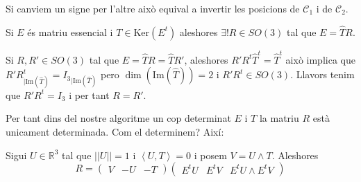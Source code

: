 \documentclass[../main.tex]{subfiles}
\begin{document}
\begin{enumerate}
		\begin{obs}
			Si canviem un signe per l'altre això equival a invertir les posicions de $\mathcal{C}_1$ i de $\mathcal{C}_2$.
		\end{obs}
		\begin{proposicio}
			Si $E$ és matriu essencial i $T \in \text{Ker}(E^t)$ aleshores $\exists!R\in SO(3)$ tal que $E = \hat{T}R$.
		\end{proposicio}
		\begin{demostracio}
			Si $R, R' \in SO(3)$ tal que $E = \hat{T}R = \hat{T}R'$, aleshores $R'R^t\hat{T}^t = \hat{T}^t$ això implica que $R'R^t_{|\text{Im}(\hat{T})} = {I_3}_{|\text{Im}(\hat{T})}$ pero $\dim(\text{Im}(\hat{T})) = 2$ i $R'R^t \in SO(3)$. Llavors tenim que $R'R^t = I_3$ i per tant $R = R'$.
		\end{demostracio}
		Per tant dins del nostre algoritme un cop determinat $E$ i $T$ la matriu $R$ està unicament determinada. Com el determinem? Així:
		\begin{proposicio}
			Sigui $U \in \mathbb{R}^3$ tal que $||U|| = 1$ i $\left\langle U, T \right\rangle = 0$ i posem $V = U \wedge T$. Aleshores
			\begin{displaymath}
				R = \begin{pmatrix}V&-U&-T\end{pmatrix}\begin{pmatrix}E^tU&E^tV&E^tU\wedge E^tV\end{pmatrix}
			\end{displaymath}
		\end{proposicio}
	\end{enumerate}
\end{document}
